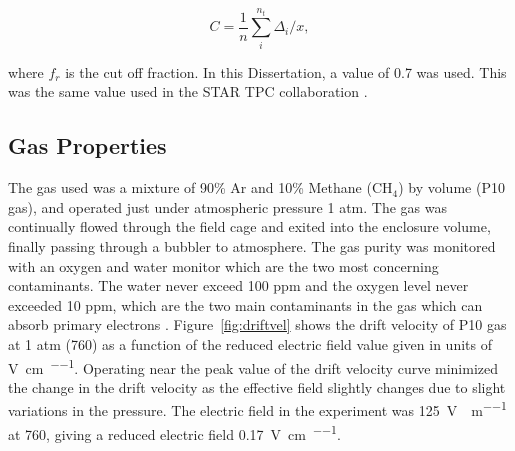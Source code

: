 \begin{equation}
C = \frac{1}{n} \sum\limits_{i}^{n_t} \Delta_i/x,
\label{eq:truncmean}
\end{equation}

where $f_r$ is the cut off fraction. In this Dissertation, a value of 0.7 was used. This was the same value used in the STAR TPC collaboration \cite{starsyst}. 








\subsection{Gas Properties}
The gas used was a mixture of 90\% Ar and 10\% Methane ($\mathrm{CH_4}$) by volume (P10 gas), and operated just under atmospheric pressure 1 atm. The gas was continually flowed through the field cage and exited into the enclosure volume, finally passing through a bubbler to atmosphere. The gas purity was monitored with an oxygen and water monitor which are the two most concerning contaminants. The water never exceed  100 ppm  and the oxygen level never exceeded 10 ppm, which are the two main contaminants in the gas which can absorb primary electrons \cite{tpcAging}. Figure~\ref{fig:driftvel} shows the drift velocity of P10 gas at 1 atm (\SI{760}{\torr}) as a function of the reduced electric field value given in units of \si{\volt\per\centi\metre\per\torr}. Operating near the peak value of the drift velocity curve minimized the change in the drift velocity as the effective field slightly changes due to slight variations in the pressure. The electric field in the experiment was \SI{125}{\volt\per\centi\per\metre} at \SI{760}{\torr}, giving a reduced electric field \SI{0.17}{\volt\per\centi\metre\per\torr}.

